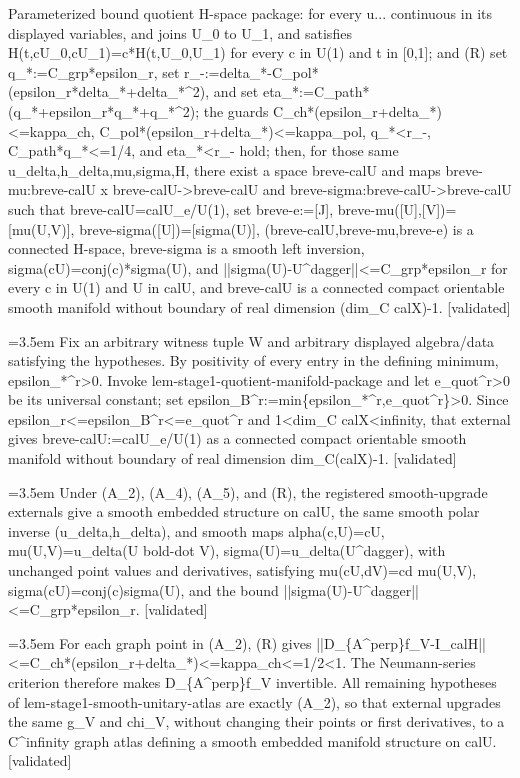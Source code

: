 \documentclass{article}
\newcommand{\step}[1]{\par\noindent\hangindent=3.5em\hangafter=1%
  \makebox[3.5em][l]{\textbf{#1.}}}
\newcommand{\steptag}[1]{\hfill{\small\textsf{[#1]}}}
\begin{document}
\begin{proofbox}{Parameterized bound quotient H-space package: for every u...}
continuous in its displayed variables, and joins U\_0 to U\_1, and satisfies H(t,cU\_0,cU\_1)=c*H(t,U\_0,U\_1) for every c in U(1) and t in [0,1]; and (R) set q\_*:=C\_grp*epsilon\_r, set r\_-:=delta\_*-C\_pol*(epsilon\_r*delta\_*+delta\_*\textasciicircum{}2), and set eta\_*:=C\_path*(q\_*+epsilon\_r*q\_*+q\_*\textasciicircum{}2); the guards C\_ch*(epsilon\_r+delta\_*)<=kappa\_ch, C\_pol*(epsilon\_r+delta\_*)<=kappa\_pol, q\_*<r\_-, C\_path*q\_*<=1/4, and eta\_*<r\_- hold; then, for those same u\_delta,h\_delta,mu,sigma,H, there exist a space breve-calU and maps breve-mu:breve-calU x breve-calU->breve-calU and breve-sigma:breve-calU->breve-calU such that breve-calU=calU\_e/U(1), set breve-e:=[J], breve-mu([U],[V])=[mu(U,V)], breve-sigma([U])=[sigma(U)], (breve-calU,breve-mu,breve-e) is a connected H-space, breve-sigma is a smooth left inversion, sigma(cU)=conj(c)*sigma(U), and ||sigma(U)-U\textasciicircum{}dagger||<=C\_grp*epsilon\_r for every c in U(1) and U in calU, and breve-calU is a connected compact orientable smooth manifold without boundary of real dimension (dim\_C calX)-1. \steptag{validated} \\[6pt]
\step{1.1} Fix an arbitrary witness tuple W and arbitrary displayed algebra/data satisfying the hypotheses. By positivity of every entry in the defining minimum, epsilon\_*\textasciicircum{}r>0. Invoke lem-stage1-quotient-manifold-package and let e\_quot\textasciicircum{}r>0 be its universal constant; set epsilon\_B\textasciicircum{}r:=min\{epsilon\_*\textasciicircum{}r,e\_quot\textasciicircum{}r\}>0. Since epsilon\_r<=epsilon\_B\textasciicircum{}r<=e\_quot\textasciicircum{}r and 1<dim\_C calX<infinity, that external gives breve-calU:=calU\_e/U(1) as a connected compact orientable smooth manifold without boundary of real dimension dim\_C(calX)-1. \steptag{validated} \\[4pt]
\step{1.2} Under (A\_2), (A\_4), (A\_5), and (R), the registered smooth-upgrade externals give a smooth embedded structure on calU, the same smooth polar inverse (u\_delta,h\_delta), and smooth maps alpha(c,U)=cU, mu(U,V)=u\_delta(U bold-dot V), sigma(U)=u\_delta(U\textasciicircum{}dagger), with unchanged point values and derivatives, satisfying mu(cU,dV)=cd mu(U,V), sigma(cU)=conj(c)sigma(U), and the bound ||sigma(U)-U\textasciicircum{}dagger||<=C\_grp*epsilon\_r. \steptag{validated} \\[6pt]
\step{1.2.1} For each graph point in (A\_2), (R) gives ||D\_\{A\textasciicircum{}perp\}f\_V-I\_calH||<=C\_ch*(epsilon\_r+delta\_*)<=kappa\_ch<=1/2<1. The Neumann-series criterion therefore makes D\_\{A\textasciicircum{}perp\}f\_V invertible. All remaining hypotheses of lem-stage1-smooth-unitary-atlas are exactly (A\_2), so that external upgrades the same g\_V and chi\_V, without changing their points or first derivatives, to a C\textasciicircum{}infinity graph atlas defining a smooth embedded manifold structure on calU. \steptag{validated} \\[4pt]

\end{proofbox}
\end{document}
